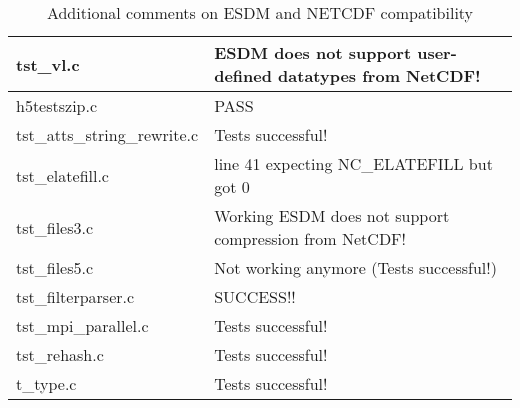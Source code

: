 \begin{table}[H]
\begin{tabular}{|l|l|}
tst\_vl.c   &   ESDM does not support user-defined datatypes from NetCDF!    \\ \hline
h5testszip.c   & PASS   \\ \hline
tst\_atts\_string\_rewrite.c   & Tests successful!  \\ \hline
tst\_elatefill.c   & line 41 expecting NC\_ELATEFILL but got 0   \\ \hline
tst\_files3.c   & Working ESDM does not support compression from NetCDF!   \\ \hline
tst\_files5.c   & Not working anymore (Tests successful!)  \\ \hline
tst\_filterparser.c   & SUCCESS!!   \\ \hline
tst\_mpi\_parallel.c   & Tests successful!   \\ \hline
tst\_rehash.c   & Tests successful!  \\ \hline
t\_type.c   & Tests successful!   \\ \hline
\hline
\end{tabular}
\caption{Additional comments on ESDM and NETCDF compatibility}
\end{table}


